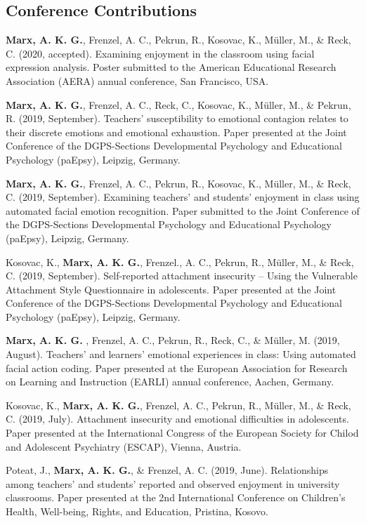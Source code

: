 \documentclass[letterpaper]{article}
\renewenvironment{itemize}{ %
  \begin{list}{}{ %
    \setlength{\leftmargin}{2.5em} %
  }
}{
  \end{list}
}
\begin{document}
\subsection*{Conference Contributions}
\begin{itemize}
\item {\bf Marx, A. K. G.}, Frenzel, A. C., Pekrun, R., Kosovac, K., Müller, M., \& Reck, C. (2020, accepted). Examining enjoyment in the classroom using facial expression analysis. Poster submitted to the American Educational Research Association (AERA) annual conference, San Francisco, USA.
\item {\bf Marx, A. K. G.}, Frenzel, A. C., Reck, C., Kosovac, K., Müller, M., \& Pekrun, R. (2019, September). Teachers’ susceptibility to emotional contagion relates to their discrete emotions and emotional exhaustion. Paper presented at the Joint Conference of the DGPS-Sections Developmental Psychology and Educational Psychology (paEpsy), Leipzig, Germany.
\item {\bf Marx, A. K. G.}, Frenzel, A. C., Pekrun, R., Kosovac, K., Müller, M., \& Reck, C. (2019, September). Examining teachers’ and students’ enjoyment in class using automated facial emotion recognition. Paper submitted to the Joint Conference of the DGPS-Sections Developmental Psychology and Educational Psychology (paEpsy), Leipzig, Germany.
\item Kosovac, K., {\bf Marx, A. K. G.}, Frenzel., A. C., Pekrun, R., Müller, M., \& Reck, C. (2019, September). Self-reported attachment insecurity – Using the Vulnerable Attachment Style Questionnaire in adolescents. Paper presented at the Joint Conference of the DGPS-Sections Developmental Psychology and Educational Psychology (paEpsy), Leipzig, Germany.
\item {\bf Marx, A. K. G. }, Frenzel, A. C., Pekrun, R., Reck, C., \& Müller, M. (2019, August). Teachers’ and learners’ emotional experiences in class: Using automated facial action coding. Paper presented at the European Association for Research on Learning and Instruction (EARLI) annual conference, Aachen, Germany.
\item Kosovac, K., {\bf Marx, A. K. G.}, Frenzel, A. C., Pekrun, R., Müller, M., \& Reck, C. (2019, July). Attachment insecurity and emotional difficulties in adolescents. Paper presented at the International Congress of the European Society for Chilod and Adolescent Psychiatry (ESCAP), Vienna, Austria.
\item Poteat, J., {\bf Marx, A. K. G.}, \& Frenzel, A. C. (2019, June). Relationships among teachers' and students' reported and observed enjoyment in university classrooms. Paper presented at the 2nd International Conference on Children's Health, Well-being, Rights, and Education, Pristina, Kosovo.

\end{itemize}
\end{document}
